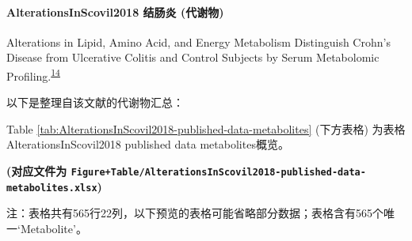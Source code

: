 \documentclass[
]{article}
\begin{document}
\hypertarget{alterationsinscovil2018-ux7ed3ux80a0ux708e-ux4ee3ux8c22ux7269}{%
\paragraph{AlterationsInScovil2018 结肠炎 (代谢物)}\label{alterationsinscovil2018-ux7ed3ux80a0ux708e-ux4ee3ux8c22ux7269}}

Alterations in Lipid, Amino Acid, and Energy Metabolism Distinguish Crohn's Disease from Ulcerative Colitis and Control Subjects by Serum Metabolomic Profiling.\textsuperscript{\protect\hyperlink{ref-AlterationsInScovil2018}{14}}

以下是整理自该文献的代谢物汇总：

Table \ref{tab:AlterationsInScovil2018-published-data-metabolites} (下方表格) 为表格AlterationsInScovil2018 published data metabolites概览。

\textbf{(对应文件为 \texttt{Figure+Table/AlterationsInScovil2018-published-data-metabolites.xlsx})}

\begin{center}\begin{tcolorbox}[colback=gray!10, colframe=gray!50, width=0.9\linewidth, arc=1mm, boxrule=0.5pt]注：表格共有565行22列，以下预览的表格可能省略部分数据；表格含有565个唯一`Metabolite'。
\end{tcolorbox}
\end{center}
\end{document}
